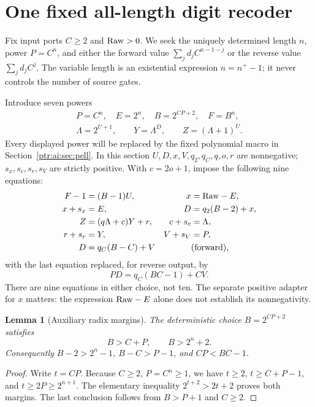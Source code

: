 \documentclass[11pt,letterpaper]{article}
\newtheorem{lemma}[theorem]{Lemma}
\theoremstyle{definition}\newtheorem{definition}[theorem]{Definition}
\theoremstyle{remark}\newtheorem{remark}[theorem]{Remark}
\begin{document}
\section{One fixed all-length digit recoder}\label{ptr:ai:sec:recoder}
Fix input ports $C\ge2$ and $\mathrm{Raw}>0$. We seek the uniquely determined length $n$, power $P=C^n$, and either the forward value $\sum_jd_jC^{n-1-j}$ or the reverse value $\sum_jd_jC^j$. The variable length is an existential expression $n=n^+-1$; it never controls the number of source gates.

Introduce seven powers
\begin{equation}\label{ptr:ai:eq:sevenpowers}
 \begin{gathered}
 P=C^n,\quad E=2^n,\quad B=2^{CP+2},\quad F=B^n,\\
 \Lambda=2^{U+1},\qquad Y=\Lambda^D,\qquad Z=(\Lambda+1)^U.
 \end{gathered}
\end{equation}
Every displayed power will be replaced by the fixed polynomial macro in Section~\ref{ptr:ai:sec:pell}. In this section $U,D,x,V,q_2,q_C,q,o,r$ are nonnegative; $s_x,s_c,s_r,s_V$ are strictly positive. With $c=2o+1$, impose the following nine equations:
\begin{align}
 F-1&=(B-1)U,& x&=\mathrm{Raw}-E,\label{ptr:ai:eq:recode1}\\
 x+s_x&=E,&D&=q_2(B-2)+x,\label{ptr:ai:eq:recode2}\\
 Z&=(q\Lambda+c)Y+r,& c+s_c&=\Lambda,\label{ptr:ai:eq:recode3}\\
 r+s_r&=Y,&V+s_V&=P,\label{ptr:ai:eq:recode4}\\
 D&=q_C(B-C)+V &&\text{(forward)},\label{ptr:ai:eq:forward}
\end{align}
with the last equation replaced, for reverse output, by
\begin{equation}\label{ptr:ai:eq:reverse}
 PD=q_C(BC-1)+CV.
\end{equation}
There are nine equations in either choice, not ten. The separate positive adapter for $x$ matters: the expression $\mathrm{Raw}-E$ alone does not establish its nonnegativity.

\begin{lemma}[Auxiliary radix margins]\label{ptr:ai:lem:radix}
The deterministic choice $B=2^{CP+2}$ satisfies
\[
 B>C+P,\qquad B>2^n+2.
\]
Consequently $B-2>2^n-1$, $B-C>P-1$, and $CP<BC-1$.
\end{lemma}
\begin{proof}
Write $t=CP$. Because $C\ge2$, $P=C^n\ge1$, we have $t\ge2$, $t\ge C+P-1$, and $t\ge2P\ge2^{n+1}$. The elementary inequality $2^{t+2}>2t+2$ proves both margins. The last conclusion follows from $B>P+1$ and $C\ge2$.
\end{proof}
\end{document}

